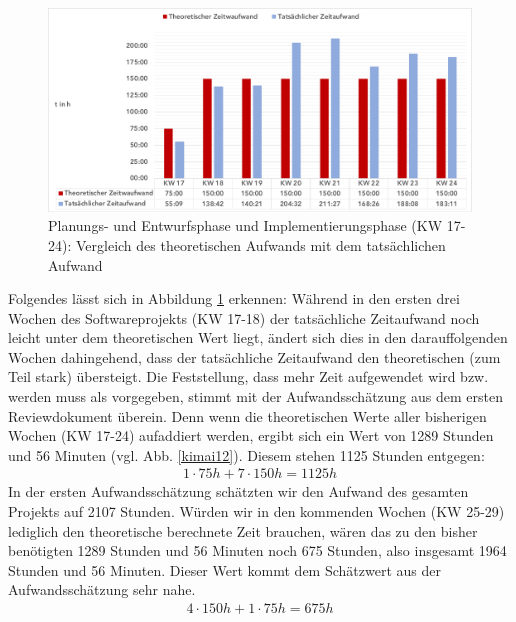 \documentclass[../review_3.tex]{subfiles}
\begin{document}
\begin{figure} [h]
    \centering
    \includegraphics[width = \linewidth, trim=8pt 5pt 8pt 8pt, clip]{img/kimai8.pdf}
    \caption{Planungs- und Entwurfsphase und Implementierungsphase (KW 17-24): Vergleich des theoretischen Aufwands mit dem tatsächlichen Aufwand}
    \label{kimai8}
\end{figure}
Folgendes lässt sich in Abbildung \ref{kimai8} erkennen:
Während in den ersten drei Wochen des Softwareprojekts (KW 17-18) der tatsächliche Zeitaufwand noch leicht unter dem theoretischen Wert liegt, ändert sich dies in den darauffolgenden Wochen dahingehend, dass der tatsächliche Zeitaufwand den theoretischen (zum Teil stark) übersteigt.
Die Feststellung, dass mehr Zeit aufgewendet wird bzw. werden muss als vorgegeben,  stimmt mit der Aufwandsschätzung aus dem ersten Reviewdokument überein.
Denn wenn die theoretischen Werte aller bisherigen Wochen (KW 17-24) aufaddiert werden, ergibt sich ein Wert von 1289 Stunden und 56 Minuten (vgl. Abb. \ref{kimai12}). Diesem stehen 1125 Stunden entgegen:
\begin{align*}
    1 \cdot 75h+7 \cdot 150h= 1125h
\end{align*}
In der ersten Aufwandsschätzung schätzten wir den Aufwand des gesamten Projekts auf 2107 Stunden.
Würden wir in den kommenden Wochen (KW 25-29) \glqq lediglich\grqq{} den theoretische berechnete Zeit brauchen, wären das zu den bisher benötigten 1289 Stunden und 56 Minuten noch 675 Stunden, also insgesamt 1964 Stunden und 56 Minuten. Dieser Wert kommt dem Schätzwert aus der Aufwandsschätzung sehr nahe.
\begin {align*}
4 \cdot 150h + 1 \cdot 75h = 675h
\end{align*}
\end{document}
